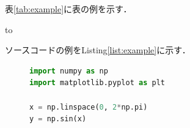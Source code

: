 表\ref{tab:example}に表の例を示す．

\begin{table}[tb]
    \caption{表の例}
    \label{tab:example}
    \hbox to
\end{table}

ソースコードの例をListing\ref{list:example}に示す．

\begin{figure}[tb]
    \begin{lstlisting}[language=Python, caption={ソースコードの例}, label={list:example}]
import numpy as np
import matplotlib.pyplot as plt

x = np.linspace(0, 2*np.pi)
y = np.sin(x)
\end{lstlisting}
\end{figure}


